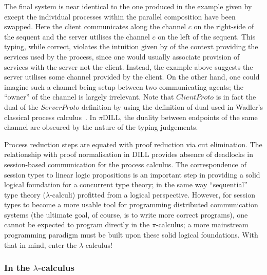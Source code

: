 The final system is near identical to the one produced in the example given by
\citeauthor{Caires:2010:STI} except the individual processes within the
parallel composition have been swapped. Here the client communicates along the
channel $c$ on the right-side of the sequent and the server utilises the
channel $c$ on the left of the sequent. This typing, while correct, violates
the intuition given by \citeauthor{Caires:2010:STI} of the context providing
the services used by the process, since one would usually associate provision
of services with the server not the client. Instead, the example above
suggests the server utilises some channel provided by the client. On the other
hand, one could imagine such a channel being setup between two communicating
agents; the ``owner'' of the channel is largely irrelevant. Note that
$ClientProto$ is in fact the dual of the $ServerProto$ definition by
\citeauthor{Caires:2010:STI} using the definition of dual used in Wadler's
classical process calculus~\cite{Wadler:2014}. In $\pi$DILL, the duality
between endpoints of the same channel are obscured by the nature of the typing
judgements.

Process reduction steps are equated with proof reduction via cut
elimination. The relationship with proof normalisation in DILL provides
absence of deadlocks in session-based communication for the process
calculus. The correspondence of session types to linear logic propositions is
an important step in providing a solid logical foundation for a concurrent
type theory; in the same way ``sequential'' type theory ($\lambda$-calculi)
profitted from a logical perspective. However, for session types to become a
more usable tool for programming distributed communication systems (the
ultimate goal, of course, is to write more correct programs), one cannot be
expected to program directly in the $\pi$-calculus; a more mainstream
programming paradigm must be built upon these solid logical foundations. With
that in mind, enter the $\lambda$-calculus!

\subsubsection{In the \texorpdfstring{$\lambda$}{lambda}-calculus}
\label{sec:lam}


